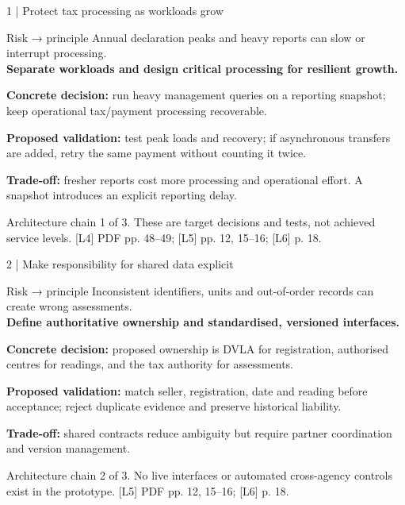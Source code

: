 \documentclass[10pt,aspectratio=169]{beamer}
\newcommand{\sources}[1]{\par\vfill{\fontsize{6.5}{7.8}\selectfont\color{muted}#1\par}}
\begin{document}
\begin{frame}{1 | Protect tax processing as workloads grow}
\begin{block}{Risk → principle}
Annual declaration peaks and heavy reports can slow or interrupt processing.\\
\textbf{Separate workloads and design critical processing for resilient growth.}
\end{block}
\textbf{Concrete decision:} run heavy management queries on a reporting snapshot; keep operational tax/payment processing recoverable.
\par\medskip
\textbf{Proposed validation:} test peak loads and recovery; if asynchronous transfers are added, retry the same payment without counting it twice.
\par\medskip
\textbf{Trade-off:} fresher reports cost more processing and operational effort. A snapshot introduces an explicit reporting delay.
\sources{Architecture chain 1 of 3. These are target decisions and tests, not achieved service levels. [L4] PDF pp. 48–49; [L5] pp. 12, 15–16; [L6] p. 18.}
\end{frame}

\begin{frame}{2 | Make responsibility for shared data explicit}
\begin{block}{Risk → principle}
Inconsistent identifiers, units and out-of-order records can create wrong assessments.\\
\textbf{Define authoritative ownership and standardised, versioned interfaces.}
\end{block}
\textbf{Concrete decision:} proposed ownership is DVLA for registration, authorised centres for readings, and the tax authority for assessments.
\par\medskip
\textbf{Proposed validation:} match seller, registration, date and reading before acceptance; reject duplicate evidence and preserve historical liability.
\par\medskip
\textbf{Trade-off:} shared contracts reduce ambiguity but require partner coordination and version management.
\sources{Architecture chain 2 of 3. No live interfaces or automated cross-agency controls exist in the prototype. [L5] PDF pp. 12, 15–16; [L6] p. 18.}
\end{frame}
\end{document}
